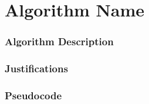 \documentclass[Group45_Project_Report.tex]{subfiles}
\begin{document}
\part*{Algorithm Name}

\section*{Algorithm Description}

\section*{Justifications}

\section*{Pseudocode}
\end{document}
